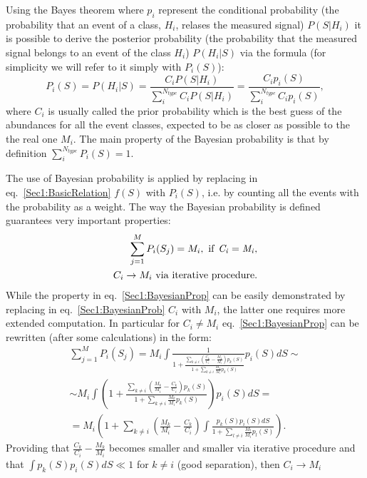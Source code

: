 Using the Bayes theorem where $p_{i}$ represent the conditional probability (the probability that an event of a class, $H_{i}$, relases the measured signal) $P(S|H_{i})$ it is possible to derive the posterior probability (the probability that the measured signal belongs to an event of the class $H_{i}$) $P(H_{i}|S)$ via the formula (for simplicity we will refer to it simply with $P_{i}(S)$):
\begin{equation}
\label{Sec1:BayesianProb}
P_{i}(S) = P(H_{i}|S) = \frac{C_{i} P(S|H_{i})}{\sum\limits_{i}^{N_{type}}C_{i} P(S|H_{i})} = \frac{C_{i} p_{i}(S)}{\sum\limits_{i}^{N_{type}}C_{i} p_{i}(S)},
\end{equation}
where $C_{i}$ is usually called the prior probability which is the best guess of the abundances for all the event classes, expected to be as closer as possible to the the real one $M_{i}$. The main property of the Bayesian probability is that by definition $\sum\limits_{i}^{N_{type}} P_{i}(S) = 1$.

The use of Bayesian probability is applied by replacing in eq.~\ref{Sec1:BasicRelation} $f(S)$ with $P_{i}(S)$, i.e. by counting all the events with the probability as a weight. The way the Bayesian probability is defined guarantees very important properties:
\begin{eqnarray}
\label{Sec1:BayesianProp}
\sum\limits_{j=1}^{M}P_{i}(S_j) = M_{i},{\rm\ if\ {\it C_{i} = M_{i}}}, \\
\label{Sec1:BayesianProp2}
C_{i} \rightarrow M_{i} {\rm\ via\ iterative\ procedure}.
\end{eqnarray}
While the property in eq.~\ref{Sec1:BayesianProp} can be easily demonstrated by replacing in eq.~\ref{Sec1:BayesianProb}  $C_{i}$ with $M_{i}$, the latter one requires more extended computation.
In particular for $C_{i} \neq M_{i}$ eq.~\ref{Sec1:BayesianProp} can be rewritten (after some calculations) in the form:
\begin{eqnarray}
\label{Sec1:BayesFullCalc}
\sum\limits_{j=1}^{M}P_{i}(S_j) = M_{i} \int \frac{1}{1+\frac{\sum\limits_{k \neq i} \left( \frac{C_k}{C_i} - \frac{M_k}{M_i} \right) p_{k}(S)}{1 + \sum\limits_{k \neq i} \frac{M_k}{M_i} p_k(S)}} p_{i}(S)dS \sim \\
\sim M_{i} \int  \left( 1+\frac{\sum\limits_{k \neq i} \left( \frac{M_k}{M_i} - \frac{C_k}{C_i} \right) p_{k}(S)}{1 + \sum\limits_{k \neq i} \frac{M_k}{M_i} p_k(S)} \right) p_{i}(S)dS = \\
= M_{i}  \left( 1 + \sum\limits_{k \neq i}  \left( \frac{M_k}{M_i} - \frac{C_k}{C_i} \right) \int  \frac{p_{k}(S)p_{i}(S)dS}{1+\sum\limits_{l \neq i} \frac{M_l}{M_i} p_l(S)} \right).
\end{eqnarray}
Providing that $\frac{C_k}{C_i} - \frac{M_k}{M_i}$ becomes smaller and smaller via iterative procedure and that $\int p_{k}(S)p_{i}(S)dS \ll 1$ for $k \neq i$ (good separation), then $C_i \rightarrow M_i$

